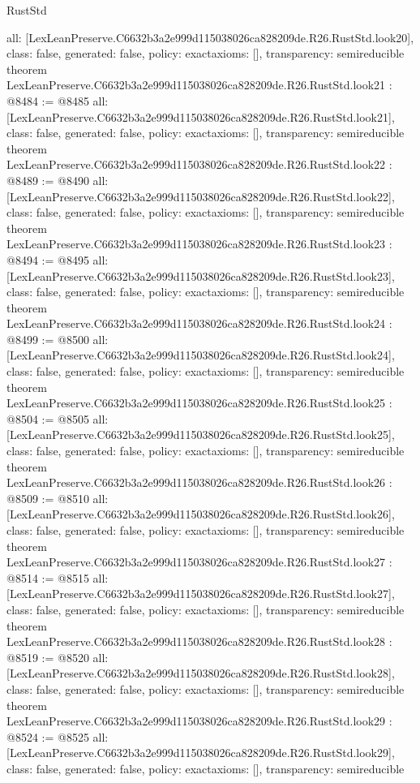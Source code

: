 \begin{lexlean}{RustStd}
\begin{coremodule}
{  all: [LexLeanPreserve.C6632b3a2e999d115038026ca828209de.R26.RustStd.look20],
  class: false,
  generated: false,
  policy: exact{axioms: []},
  transparency: semireducible
}
theorem LexLeanPreserve.C6632b3a2e999d115038026ca828209de.R26.RustStd.look21 : @8484 := @8485 {
  all: [LexLeanPreserve.C6632b3a2e999d115038026ca828209de.R26.RustStd.look21],
  class: false,
  generated: false,
  policy: exact{axioms: []},
  transparency: semireducible
}
theorem LexLeanPreserve.C6632b3a2e999d115038026ca828209de.R26.RustStd.look22 : @8489 := @8490 {
  all: [LexLeanPreserve.C6632b3a2e999d115038026ca828209de.R26.RustStd.look22],
  class: false,
  generated: false,
  policy: exact{axioms: []},
  transparency: semireducible
}
theorem LexLeanPreserve.C6632b3a2e999d115038026ca828209de.R26.RustStd.look23 : @8494 := @8495 {
  all: [LexLeanPreserve.C6632b3a2e999d115038026ca828209de.R26.RustStd.look23],
  class: false,
  generated: false,
  policy: exact{axioms: []},
  transparency: semireducible
}
theorem LexLeanPreserve.C6632b3a2e999d115038026ca828209de.R26.RustStd.look24 : @8499 := @8500 {
  all: [LexLeanPreserve.C6632b3a2e999d115038026ca828209de.R26.RustStd.look24],
  class: false,
  generated: false,
  policy: exact{axioms: []},
  transparency: semireducible
}
theorem LexLeanPreserve.C6632b3a2e999d115038026ca828209de.R26.RustStd.look25 : @8504 := @8505 {
  all: [LexLeanPreserve.C6632b3a2e999d115038026ca828209de.R26.RustStd.look25],
  class: false,
  generated: false,
  policy: exact{axioms: []},
  transparency: semireducible
}
theorem LexLeanPreserve.C6632b3a2e999d115038026ca828209de.R26.RustStd.look26 : @8509 := @8510 {
  all: [LexLeanPreserve.C6632b3a2e999d115038026ca828209de.R26.RustStd.look26],
  class: false,
  generated: false,
  policy: exact{axioms: []},
  transparency: semireducible
}
theorem LexLeanPreserve.C6632b3a2e999d115038026ca828209de.R26.RustStd.look27 : @8514 := @8515 {
  all: [LexLeanPreserve.C6632b3a2e999d115038026ca828209de.R26.RustStd.look27],
  class: false,
  generated: false,
  policy: exact{axioms: []},
  transparency: semireducible
}
theorem LexLeanPreserve.C6632b3a2e999d115038026ca828209de.R26.RustStd.look28 : @8519 := @8520 {
  all: [LexLeanPreserve.C6632b3a2e999d115038026ca828209de.R26.RustStd.look28],
  class: false,
  generated: false,
  policy: exact{axioms: []},
  transparency: semireducible
}
theorem LexLeanPreserve.C6632b3a2e999d115038026ca828209de.R26.RustStd.look29 : @8524 := @8525 {
  all: [LexLeanPreserve.C6632b3a2e999d115038026ca828209de.R26.RustStd.look29],
  class: false,
  generated: false,
  policy: exact{axioms: []},
  transparency: semireducible
}
\end{coremodule}
\end{lexlean}
